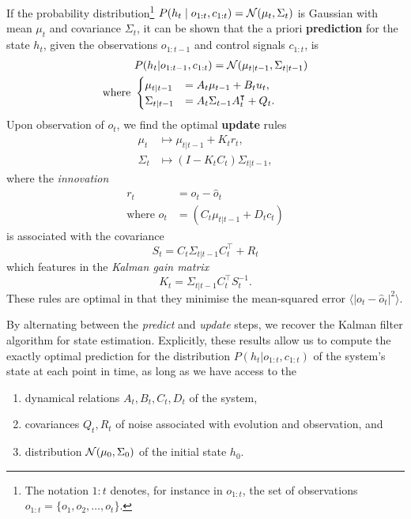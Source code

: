         If the probability distribution\footnote{The notation $1:t$ denotes, for instance in $o_{1:t}$, the set of observations $o_{1:t} = \{o_1, o_2, \ldots, o_t\}$.} $P(h_t \mid o_{1:t}, c_{1:t}) = \mathcal{N}(\mu_t, \Sigma_t)$ is Gaussian with mean $\mu_t$ and covariance $\Sigma_t$, it can be shown that the a priori \textbf{prediction} for the state $h_t$, given the observations $o_{1:t-1}$ and control signals $c_{1:t}$, is
        \begin{align}
            &P(h_t | o_{1:t-1}, c_{1:t}) = \mathcal{N}(\mu_{t|t-1}, \Sigma_{t|t-1}) \\
            \text{where }
            &\begin{cases}
                \mu_{t|t-1} &= A_t \mu_{t-1} + B_t u_t, \\
                \Sigma_{t|t-1} &= A_t \Sigma_{t-1} A_t^\intercal + Q_t.
            \end{cases}
        \end{align}
        Upon observation of $o_t$, we find the optimal \textbf{update} rules
        \begin{align}
            \mu_t &\mapsto \mu_{t|t-1} + K_t r_t, \\
            \Sigma_t &\mapsto (I - K_t C_t) \Sigma_{t|t-1},
        \end{align}
        where the \emph{innovation}
        \begin{align}
            r_t &= o_t - \hat{o}_t \\
            \text{where }\hat{o}_t &= (C_t \mu_{t|t-1} + D_t c_t)
        \end{align}
        is associated with the covariance
        \begin{equation}
            S_t = C_t \Sigma_{t|t-1} C_t^\intercal + R_t
        \end{equation}
        which features in the \emph{Kalman gain matrix}
        \begin{equation}
            K_t = \Sigma_{t|t-1} C_t^\intercal S_t^{-1}.
        \end{equation}
        These rules are optimal in that they minimise the mean-squared error $\langle \lvert o_t - \hat{o}_t \rvert^2 \rangle$.

        By alternating between the \emph{predict} and \emph{update} steps, we recover the Kalman filter algorithm for state estimation.
        Explicitly, these results allow us to compute the exactly optimal prediction for the distribution $P(h_t | o_{1:t}, c_{1:t})$ of the system's state at each point in time, as long as we have access to the
        \begin{enumerate}
            \item dynamical relations $A_t, B_t, C_t, D_t$ of the system,
            \item covariances $Q_t, R_t$ of noise associated with evolution and observation, and
            \item distribution $\mathcal{N}(\mu_0, \Sigma_0)$ of the initial state $h_0$.
        \end{enumerate}

